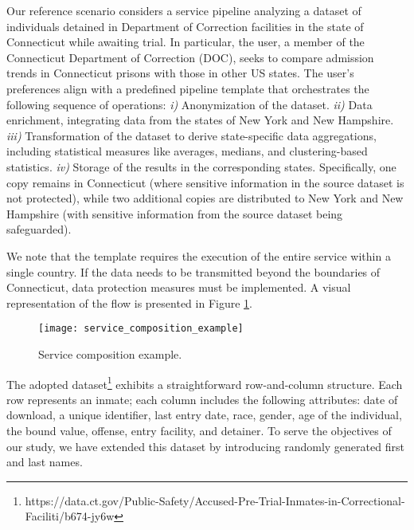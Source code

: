 Our reference scenario considers a service pipeline analyzing a dataset of individuals detained in Department of Correction facilities in the state of Connecticut while awaiting trial. In particular, the user, a member of the Connecticut Department of Correction (DOC), seeks to compare admission trends in Connecticut prisons with those in other US states.
The user's preferences align with a predefined pipeline template that orchestrates the following sequence of operations:
\emph{i)} Anonymization of the dataset.
\emph{ii)} Data enrichment, integrating data from the states of New York and New Hampshire.
\emph{iii)} Transformation of the dataset to derive state-specific data aggregations, including statistical measures like averages, medians, and clustering-based statistics.
\emph{iv)} Storage of the results in the corresponding states. Specifically, one copy remains in Connecticut (where sensitive information in the source dataset is not protected), while two additional copies are distributed to New York and New Hampshire (with sensitive information from the source dataset being safeguarded).

We note that the template requires the execution of the entire service within a single country. If the data needs to be transmitted beyond the boundaries of Connecticut, data protection measures must be implemented. A visual representation of the flow is presented in Figure \ref{fig:service_composition_example}.

\begin{figure}
  \texttt{[image: service\_composition\_example]}
  \caption{Service composition example.}\label{fig:service_composition_example}

\end{figure}

The adopted dataset\footnote{https://data.ct.gov/Public-Safety/Accused-Pre-Trial-Inmates-in-Correctional-Faciliti/b674-jy6w} exhibits a straightforward row-and-column structure.
Each row represents an inmate; each column includes the following attributes: date of download, a unique identifier, last entry date, race, gender, age of the individual, the bound value, offense, entry facility, and detainer.
To serve the objectives of our study, we have extended this dataset by introducing randomly generated first and last names.


